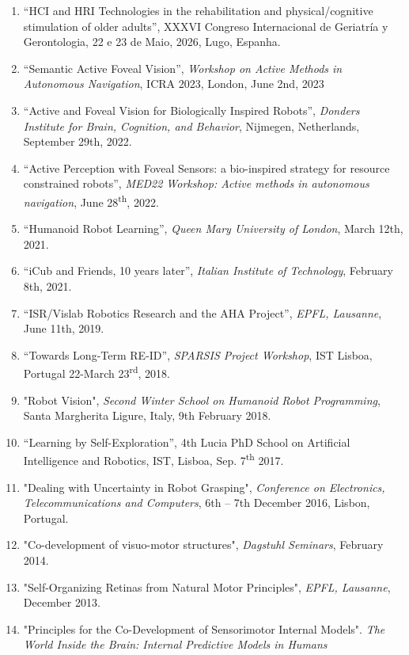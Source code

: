 \begin{enumerate}
\def\labelenumi{\arabic{enumi}.}
\item
  ``HCI and HRI Technologies in the rehabilitation and
  physical/cognitive stimulation of older adults'', XXXVI Congreso
  Internacional de Geriatría y Gerontologia, 22 e 23 de Maio, 2026,
  Lugo, Espanha.
\item
  ``Semantic Active Foveal Vision'', \emph{Workshop on Active Methods in
  Autonomous Navigation}, ICRA 2023, London, June 2nd, 2023
\item
  ``Active and Foveal Vision for Biologically Inspired Robots'',
  \emph{Donders Institute for Brain, Cognition, and Behavior}, Nijmegen,
  Netherlands, September 29th, 2022.
\item
  ``Active Perception with Foveal Sensors: a bio-inspired strategy for
  resource constrained robots'', \emph{MED22 Workshop: Active methods in
  autonomous navigation}, June 28\textsuperscript{th}, 2022.
\item
  ``Humanoid Robot Learning'', \emph{Queen Mary University of London},
  March 12th, 2021.
\item
  ``iCub and Friends, 10 years later'', \emph{Italian Institute of
  Technology}, February 8th, 2021.
\item
  ``ISR/Vislab Robotics Research and the AHA Project'', \emph{EPFL,
  Lausanne}, June 11th, 2019.
\item
  ``Towards Long-Term RE-ID'', \emph{SPARSIS Project Workshop}, IST
  Lisboa, Portugal 22-March 23\textsuperscript{rd}, 2018.
\item
  "Robot Vision", \emph{Second Winter School on Humanoid Robot
  Programming}, Santa Margherita Ligure, Italy, 9th February 2018.
\item
  ``Learning by Self-Exploration'', 4th Lucia PhD School on Artificial
  Intelligence and Robotics, IST, Lisboa, Sep. 7\textsuperscript{th}
  2017.
\item
  "Dealing with Uncertainty in Robot Grasping", \emph{Conference on
  Electronics, Telecommunications and Computers}, 6th -- 7th December
  2016, Lisbon, Portugal.
\item
  "Co-development of visuo-motor structures", \emph{Dagstuhl Seminars},
  February 2014.
\item
  "Self-Organizing Retinas from Natural Motor Principles", \emph{EPFL,
  Lausanne}, December 2013.~
\item
  "Principles for the Co-Development of Sensorimotor Internal Models".
  \emph{The World Inside the Brain: Internal Predictive Models in Humans
}
\end{enumerate}
